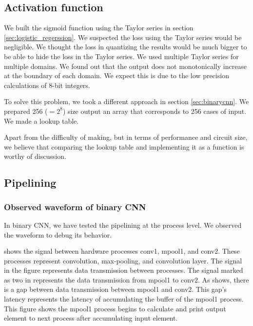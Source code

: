 \subsection{Activation function}
We built the sigmoid function using the Taylor series in section \ref{sec:logistic_regerssion}. We suspected the loss using the Taylor series would be negligible. We thought the loss in quantizing the results would be much bigger to be able to hide the loss in the Taylor series. We used multiple Taylor series for multiple domains. We found out that the output does not monotonically increase at the boundary of each domain. We expect this is due to the low precision calculations of 8-bit integers.


To solve this problem, we took a different approach in section \ref{sec:binarycnn}. We prepared 256 ($ = 2^8$) size output an array that corresponds to 256 cases of input. We made a lookup table.

Apart from the difficulty of making, but in terms of performance and circuit size, we believe that comparing the lookup table and implementing it as a function is worthy of discussion.

\subsection{Pipelining}
\subsubsection{Observed waveform of binary CNN}
In binary CNN, we have tested the pipelining at the process level. We observed the waveform to debug its behavior.

 shows the signal between hardware processes conv1, mpool1, and conv2. These processes represent convolution, max-pooling, and convolution layer. The signal in the figure represents data transmission between processes. The signal marked as two in  represents the data transmission from mpool1 to conv2. As  shows, there is a gap between data transmission between mpool1 and conv2. This gap's latency represents the latency of accumulating the buffer of the mpool1 process. This figure shows the mpool1 process begins to calculate and print output element to next process after accumulating input element.

